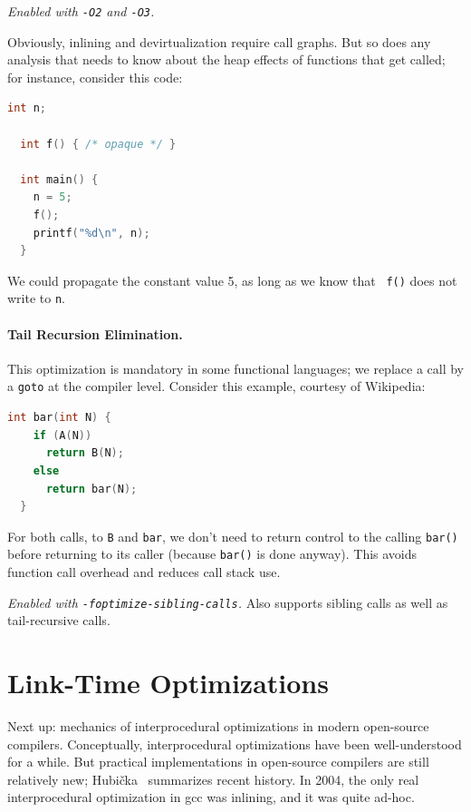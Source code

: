 \documentclass[a4paper]{report}
\begin{document}
\noindent \emph{Enabled with {\tt -O2} and {\tt -O3}.}

Obviously, inlining and devirtualization require call graphs. But so
does any analysis that needs to know about the heap effects of
functions that get called; for instance, consider this code:

{\small
\begin{lstlisting}[language=C]
  int n;

  int f() { /* opaque */ }

  int main() {
    n = 5;
    f();
    printf("%d\n", n);
  }
\end{lstlisting}
}
We could propagate the constant value 5, as long as we know that {\tt
  f()} does not write to {\tt n}.

\paragraph{Tail Recursion Elimination.} This optimization is mandatory
in some functional languages; we replace a call by a {\tt goto} at the
compiler level. Consider this example, courtesy of Wikipedia:

{\small
\begin{lstlisting}[language=C]
  int bar(int N) {
    if (A(N))
      return B(N);
    else
      return bar(N);
  }
\end{lstlisting}
}

For both calls, to {\tt B} and {\tt bar}, we don't need to return control
to the calling {\tt bar()} before returning to its caller (because {\tt bar()}
is done anyway). This avoids
function call overhead and reduces call stack use.

\noindent \emph{Enabled with {\tt -foptimize-sibling-calls}.} Also supports
sibling calls as well as tail-recursive calls.

\section*{Link-Time Optimizations}
Next up: mechanics of interprocedural optimizations in modern open-source
compilers. Conceptually, interprocedural optimizations have been well-understood
for a while. But practical implementations in open-source compilers are still
relatively new; Hubi\v{c}ka~\cite{hubicka14:_linkt_gcc} summarizes recent history.
In 2004, the only real interprocedural optimization in gcc was inlining, and it was
quite ad-hoc.
\end{document}
